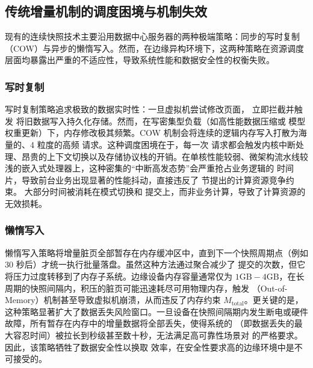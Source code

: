 \subsection{传统增量机制的调度困境与机制失效}

现有的连续快照技术主要沿用数据中心服务器的两种极端策略：同步的写时复制（COW）与异步的懒惰写入。然而，在边缘异构环境下，这两种策略在资源调度层面均暴露出严重的不适应性，导致系统性能和数据安全性的权衡失败。

\subsubsection{写时复制}

写时复制策略追求极致的数据实时性：一旦虚拟机尝试修改页面， 立即拦截并触发  将旧数据写入持久化存储。然而，在写密集型负载（如高性能数据压缩或  模型权重更新）下，内存修改极其频繁。COW 机制会将连续的逻辑内存写入打散为海量的、4 粒度的高频  请求\cite{bonwick2005zfs, rodeh2013btrfs}。这种调度困境在于，每一次  请求都会触发内核中断处理、昂贵的上下文切换以及存储协议栈的开销\cite{hu2020writeamp}。在单核性能较弱、微架构流水线较浅的嵌入式处理器上，这种密集的“中断高发态势”会严重抢占业务逻辑的  时间片，导致前台业务出现显著的性能抖动，直接违反了  节提出的计算资源竞争约束。  大部分时间被消耗在模式切换和  提交上，而非业务计算，导致了计算资源的无效损耗。

\subsubsection{懒惰写入}

懒惰写入策略将增量脏页全部暂存在内存缓冲区中，直到下一个快照周期点（例如 $30$ 秒后）才统一执行批量落盘\cite{zhong2016flic, panda2023snapstore}。虽然这种方法通过聚合减少了  提交的次数，但它将压力过度转移到了内存子系统。边缘设备内存容量通常仅为 $1\text{GB}-4\text{GB}$，在长周期的快照间隔内，积压的脏页可能迅速耗尽可用物理内存，触发 （Out-of-Memory）机制甚至导致虚拟机崩溃，从而违反了内存约束 $M_{\text{total}}$。更关键的是，这种策略显著扩大了数据丢失风险窗口。一旦设备在快照间隔期内发生断电或硬件故障，所有暂存在内存中的增量数据将全部丢失，使得系统的 （即数据丢失的最大容忍时间）被拉长到秒级甚至数十秒，无法满足高可靠性场景对  的严格要求。因此，该策略牺牲了数据安全性以换取  效率，在安全性要求高的边缘环境中是不可接受的。


